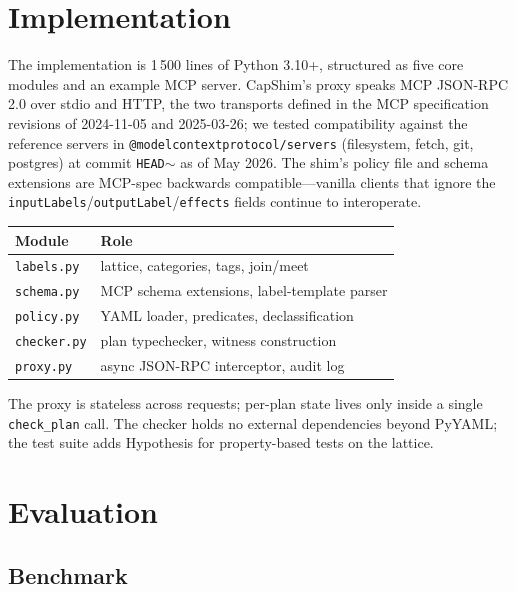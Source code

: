 \documentclass[11pt,a4paper]{article}
\begin{document}
\section{Implementation}

The implementation is 1\,500 lines of Python 3.10+, structured as
five core modules and an example MCP server. CapShim's proxy speaks
MCP JSON-RPC 2.0 over stdio and HTTP, the two transports defined in
the MCP specification revisions of 2024-11-05 and 2025-03-26; we
tested compatibility against the reference servers in
\texttt{@modelcontextprotocol/servers} (filesystem, fetch,
git, postgres) at commit \texttt{HEAD$\sim$} as of May 2026. The
shim's policy file and schema extensions are MCP-spec backwards
compatible---vanilla clients that ignore the
\texttt{inputLabels}/\texttt{outputLabel}/\texttt{effects} fields
continue to interoperate.

\begin{center}
\small
\begin{tabular}{ll}
\toprule
Module & Role \\\midrule
\texttt{labels.py}   & lattice, categories, tags, join/meet \\
\texttt{schema.py}   & MCP schema extensions, label-template parser \\
\texttt{policy.py}   & YAML loader, predicates, declassification \\
\texttt{checker.py}  & plan typechecker, witness construction \\
\texttt{proxy.py}    & async JSON-RPC interceptor, audit log \\
\bottomrule
\end{tabular}
\end{center}

The proxy is stateless across requests; per-plan state lives only
inside a single \texttt{check\_plan} call. The checker holds no
external dependencies beyond PyYAML; the test suite adds Hypothesis
for property-based tests on the lattice.

\section{Evaluation}

\subsection{Benchmark}
\end{document}
